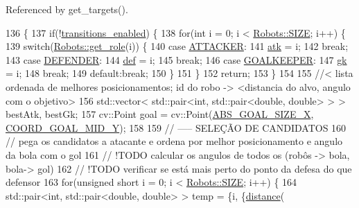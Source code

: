 Referenced by get\+\_\+targets().


\begin{DoxyCode}
136                          \{
137     \textcolor{keywordflow}{if}(!\hyperlink{class_strategy_a6d59806a95ef79a25d30c4f139c94671}{transitions\_enabled}) \{
138         \textcolor{keywordflow}{for}(\textcolor{keywordtype}{int} i = 0; i < \hyperlink{class_robots_ae9df2f1d345ad6740f0459956cdd4712}{Robots::SIZE}; i++) \{
139             \textcolor{keywordflow}{switch}(\hyperlink{class_robots_ac5cdd16502bd325581fb2d732169a326}{Robots::get\_role}(i)) \{
140                 \textcolor{keywordflow}{case} \hyperlink{strategy_8cpp_aea4f6064a6384f5525777880f0ef167f}{ATTACKER}:
141                     \hyperlink{class_strategy_af06cfb5e28b7a30cfaa312c7a1c051b1}{atk} = i;
142                 \textcolor{keywordflow}{break};
143                 \textcolor{keywordflow}{case} \hyperlink{strategy_8cpp_a692df89f7ea5a93b2cb96a2d2a8c9c36}{DEFENDER}:
144                     \hyperlink{class_strategy_ade11a007d9479832ddc5e69169e23692}{def} = i;
145                 \textcolor{keywordflow}{break};
146                 \textcolor{keywordflow}{case} \hyperlink{strategy_8cpp_afa71f4eb5f5c11de6039a07252dab1be}{GOALKEEPER}:
147                     \hyperlink{class_strategy_a7efb4f780b78ee593649340a7f948c36}{gk} = i;
148                 \textcolor{keywordflow}{break};
149                 \textcolor{keywordflow}{default}:\textcolor{keywordflow}{break};
150             \}
151         \}
152         \textcolor{keywordflow}{return};
153     \}
154 
155     \textcolor{comment}{//< lista ordenada de melhores posicionamentos; id do robo -> <distancia do alvo, angulo com o
       objetivo>}
156     std::vector< std::pair<int, std::pair<double, double> > > bestAtk, bestGk;
157     cv::Point goal = cv::Point(\hyperlink{namespace_c_o_n_s_t_a01f9b9486ce728d46c65c5d2fc2798d4}{ABS\_GOAL\_SIZE\_X}, \hyperlink{namespace_c_o_n_s_t_a227a51bc8809f1391dc096eafb6b1d85}{COORD\_GOAL\_MID\_Y});
158 
159     \textcolor{comment}{// ----- SELEÇÃO DE CANDIDATOS}
160     \textcolor{comment}{// pega os candidatos a atacante e ordena por melhor posicionamento e angulo da bola com o gol}
161     \textcolor{comment}{// !TODO calcular os angulos de todos os (robôs -> bola, bola-> gol)}
162     \textcolor{comment}{// !TODO verificar se está mais perto do ponto da defesa do que defensor}
163     \textcolor{keywordflow}{for}(\textcolor{keywordtype}{unsigned} \textcolor{keywordtype}{short} i = 0; i < \hyperlink{class_robots_ae9df2f1d345ad6740f0459956cdd4712}{Robots::SIZE}; i++) \{
164         std::pair<int, std::pair<double, double> > temp = \{i, \{\hyperlink{class_strategy_aacce05caed71553c4efd2d28c9c3aa39}{distance}(

\end{DoxyCode}
